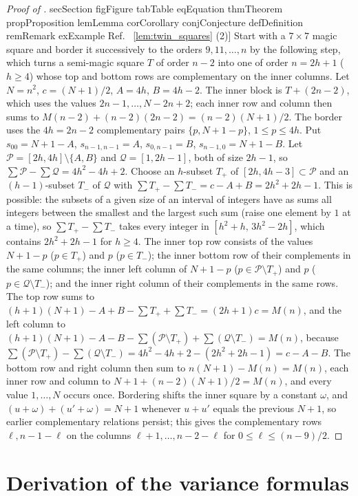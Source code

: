 \documentclass[11pt,a4paper]{article}
\makeatletter
\def\Cref@getprefix#1:#2\relax{#1}
\def\Cref@prefix@sec{sec}
\def\Cref@prefix@fig{fig}
\def\Cref@prefix@tab{tab}
\def\Cref@prefix@eq{eq}
\def\Cref@prefix@thm{thm}
\def\Cref@prefix@prop{prop}
\def\Cref@prefix@lem{lem}
\def\Cref@prefix@cor{cor}
\def\Cref@prefix@conj{conj}
\def\Cref@prefix@def{def}
\def\Cref@prefix@rem{rem}
\def\Cref@prefix@ex{ex}
\def\Cref@type@cap#1{%
  \edef\Cref@tmp{#1}%
  \ifx\Cref@tmp\Cref@prefix@sec Section%
  \else\ifx\Cref@tmp\Cref@prefix@fig Figure%
  \else\ifx\Cref@tmp\Cref@prefix@tab Table%
  \else\ifx\Cref@tmp\Cref@prefix@eq Equation%
  \else\ifx\Cref@tmp\Cref@prefix@thm Theorem%
  \else\ifx\Cref@tmp\Cref@prefix@prop Proposition%
  \else\ifx\Cref@tmp\Cref@prefix@lem Lemma%
  \else\ifx\Cref@tmp\Cref@prefix@cor Corollary%
  \else\ifx\Cref@tmp\Cref@prefix@conj Conjecture%
  \else\ifx\Cref@tmp\Cref@prefix@def Definition%
  \else\ifx\Cref@tmp\Cref@prefix@rem Remark%
  \else\ifx\Cref@tmp\Cref@prefix@ex Example%
  \else Ref.%
  \fi\fi\fi\fi\fi\fi\fi\fi\fi\fi\fi\fi
}
\DeclareRobustCommand{\Cref}[1]{%
  \begingroup
  \edef\Cref@label{#1}%
  \edef\Cref@prefix{\expandafter\Cref@getprefix\Cref@label:\relax}%
  \hyperref[#1]{\Cref@type@cap{\Cref@prefix}~\ref*{#1}}%
  \endgroup
}
\theoremstyle{plain}
\theoremstyle{definition}
\theoremstyle{remark}
\makeatother
\begin{document}
\begin{proof}[Proof of \Cref{lem:twin_squares}(2)]
Start with a $7\times7$ magic square and border it successively to the orders $9,11,\dots,n$ by the following step, which turns a semi-magic square $T$ of order $n-2$ into one of order $n=2h+1$ ($h\ge4$) whose top and bottom rows are complementary on the inner columns.
Let $N=n^2$, $c=(N+1)/2$, $A=4h$, $B=4h-2$.
The inner block is $T+(2n-2)$, which uses the values $2n-1,\dots,N-2n+2$; each inner row and column then sums to $M(n-2)+(n-2)(2n-2)=(n-2)(N+1)/2$.
The border uses the $4h=2n-2$ complementary pairs $\{p,N+1-p\}$, $1\le p\le4h$.
Put $s_{00}=N+1-A$, $s_{n-1,n-1}=A$, $s_{0,n-1}=B$, $s_{n-1,0}=N+1-B$.
Let $\mathcal P=[2h,4h]\setminus\{A,B\}$ and $\mathcal Q=[1,2h-1]$, both of size $2h-1$, so $\sum\mathcal P-\sum\mathcal Q=4h^2-4h+2$.
Choose an $h$-subset $T_+$ of $[2h,4h-3]\subset\mathcal P$ and an $(h-1)$-subset $T_-$ of $\mathcal Q$ with $\sum T_+-\sum T_-=c-A+B=2h^2+2h-1$.
This is possible: the subsets of a given size of an interval of integers have as sums all integers between the smallest and the largest such sum (raise one element by $1$ at a time), so $\sum T_+-\sum T_-$ takes every integer in $[h^2+h,\,3h^2-2h]$, which contains $2h^2+2h-1$ for $h\ge4$.
The inner top row consists of the values $N+1-p$ ($p\in T_+$) and $p$ ($p\in T_-$); the inner bottom row of their complements in the same columns; the inner left column of $N+1-p$ ($p\in\mathcal P\setminus T_+$) and $p$ ($p\in\mathcal Q\setminus T_-$); and the inner right column of their complements in the same rows.
The top row sums to $(h+1)(N+1)-A+B-\sum T_++\sum T_-=(2h+1)c=M(n)$, and the left column to $(h+1)(N+1)-A-B-\sum(\mathcal P\setminus T_+)+\sum(\mathcal Q\setminus T_-)=M(n)$, because $\sum(\mathcal P\setminus T_+)-\sum(\mathcal Q\setminus T_-)=4h^2-4h+2-(2h^2+2h-1)=c-A-B$.
The bottom row and right column then sum to $n(N+1)-M(n)=M(n)$, each inner row and column to $N+1+(n-2)(N+1)/2=M(n)$, and every value $1,\dots,N$ occurs once.
Bordering shifts the inner square by a constant $\omega$, and $(u+\omega)+(u'+\omega)=N+1$ whenever $u+u'$ equals the previous $N+1$, so earlier complementary relations persist; this gives the complementary rows $\ell,n-1-\ell$ on the columns $\ell+1,\dots,n-2-\ell$ for $0\le\ell\le(n-9)/2$.
\end{proof}

\section{Derivation of the variance formulas}
\label{sec:app_variance}
\end{document}
